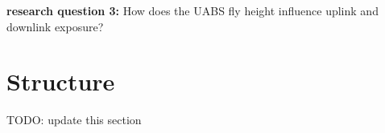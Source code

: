 \textbf{research question 3:} How does the \gls{UABS} fly height influence uplink and downlink exposure?



\section{Structure}
\label{sec:structure}

TODO: update this section


